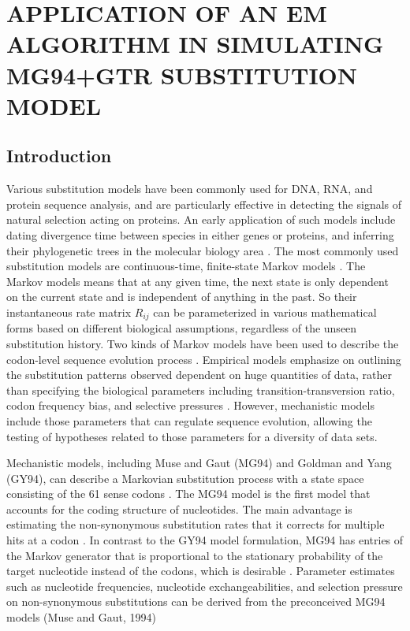 \chapter{\normalfont APPLICATION OF AN EM ALGORITHM IN SIMULATING MG94+GTR SUBSTITUTION MODEL}
\label{ch:phyloEM}

\section{Introduction}
Various substitution models have been commonly used for DNA, RNA, and protein sequence analysis, and are particularly effective in detecting the signals of natural selection acting on proteins. An early application of such models include dating divergence time between species in either genes or proteins, and inferring their phylogenetic trees in the molecular biology area \parencite{felsenstein1981evolutionary}. The most commonly used substitution models are continuous-time, finite-state Markov models \parencite{karlin2014first}. The Markov models means that at any given time, the next state is only dependent on the current state and is independent of anything in the past. So their instantaneous rate matrix $R_{ij}$ can be parameterized in various mathematical forms based on different biological assumptions, regardless of the unseen substitution history. Two kinds of Markov models have been used to describe the codon-level sequence evolution process \parencite{kosiol2007empirical}. Empirical models emphasize on outlining the substitution patterns observed dependent on huge quantities of data, rather than specifying the biological parameters including transition-transversion ratio, codon frequency bias, and selective pressures \parencite{lio1998models}. However, mechanistic models include those parameters that can regulate sequence evolution, allowing the testing of hypotheses related to those parameters for a diversity of data sets.  

Mechanistic models, including Muse and Gaut (MG94) and Goldman and Yang (GY94),  can describe a Markovian substitution process with a state space consisting of the 61 sense codons \parencite{suchard2001bayesian}. The MG94 model is the first model that accounts for the coding structure of nucleotides. The main advantage is estimating the non-synonymous substitution rates that it corrects for multiple hits at a codon \parencite{muse1994likelihood}. In contrast to the GY94 model formulation, MG94 has entries of the Markov generator that is proportional to the stationary probability of the target nucleotide instead of the codons, which is desirable \parencite{huelsenbeck2004bayesian}. Parameter estimates such as nucleotide frequencies, nucleotide exchangeabilities, and selection pressure on non-synonymous substitutions can be derived from the preconceived MG94 models (Muse and Gaut, 1994)   

